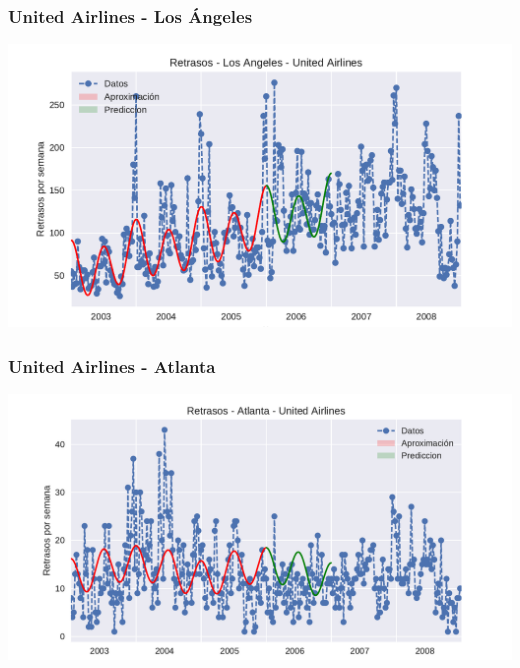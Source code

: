 \documentclass{beamer}
\begin{document}
\begin{frame}



\frametitle{United Airlines - Los Ángeles}

{\centering
  \includegraphics[width=1.0\linewidth]{diapos/imagenes/retrasosUnitedAirlinesLAvol3.pdf}
}

\end{frame}


\begin{frame}


\frametitle{United Airlines - Atlanta}

{\centering
  \includegraphics[width=1.0\linewidth]{diapos/imagenes/retrasosUnitedAirlinesATLvol3.pdf}
}

\end{frame}

\end{document}
